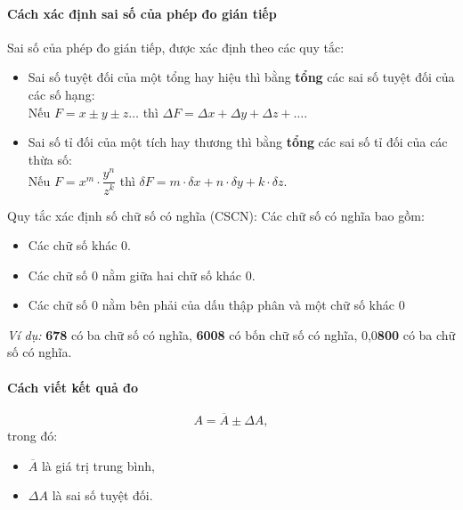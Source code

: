 \begin{tomtat}
	\paragraph{Cách xác định sai số của phép đo gián tiếp}
	Sai số của phép đo gián tiếp, được xác định theo các quy tắc:
	\begin{itemize}
		\item Sai số tuyệt đối của một tổng hay hiệu thì bằng \textbf{tổng} các sai số tuyệt đối của các số hạng:\\
		Nếu $F=x\pm y\pm z \dots$ thì $\Delta F = \Delta x + \Delta y + \Delta z+\dots$.
		\item Sai số tỉ đối của một tích hay thương thì bằng \textbf{tổng} các sai số tỉ đối của các thừa số:\\ 
		Nếu $F= x^m\cdot\dfrac{y^n}{z^k}$ thì $\delta F=m\cdot\delta x+n\cdot\delta y +k\cdot\delta z$.
	\end{itemize}
	\begin{noidung}{Quy tắc xác định số chữ số có nghĩa (CSCN):}
			Các chữ số có nghĩa bao gồm:
		\begin{itemize}
			\item Các chữ số khác 0.
			\item Các chữ số 0 nằm giữa hai chữ số khác 0.
			\item Các chữ số 0 nằm bên phải của dấu	thập phân và một chữ số khác 0
		\end{itemize}
	\end{noidung}
	\textit{Ví dụ:} \textbf{678} có ba chữ số có nghĩa, \textbf{6008} có bốn chữ số có nghĩa, 0,0\textbf{800} có ba chữ số có nghĩa.
	\paragraph{Cách viết kết quả đo}
	$$A=\overline{A} \pm \Delta A,$$
	trong đó:
	\begin{itemize}
		\item $\overline A$ là giá trị trung bình,
		\item $\Delta A$ là sai số tuyệt đối. 
	\end{itemize}
\end{tomtat}
